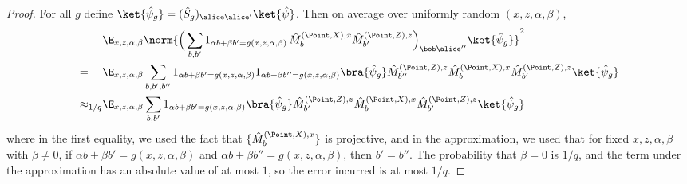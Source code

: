 \begin{proof}
	For all $g$ define $ \ket{\hat{\psi}_g} =(\hat{S}_g)_{\alice \alice'} \ket{\hat{\psi}}$. 
	Then on average over uniformly random $(x,z,\alpha,\beta)$, 
	  \begin{align}
	  	&\E_{x,z,\alpha,\beta} \norm{ \Big ( \sum_{b,b'} 1_{\alpha b + \beta b' = g(x,z,\alpha,\beta)} \, \hat{M}^{(\Point,X),x}_{b} \hat{M}^{(\Point,Z),z}_{b'} \Big)_{\bob \alice''} \ket{\hat{\psi}_g} }^2\notag \\
		=_{\phantom{1/q}}& \E_{x,z,\alpha,\beta} \sum_{b,b',b''} 1_{\alpha b + \beta b' = g(x,z,\alpha,\beta)} 1_{\alpha b + \beta b'' = g(x,z,\alpha,\beta)} \bra{\hat{\psi}_g}  \hat{M}^{(\Point,Z),z}_{b''} \hat{M}^{(\Point,X),x}_{b} \hat{M}^{(\Point,Z),z}_{b'} \ket{\hat{\psi}_g} \notag\\
		\approx_{1/q}& \E_{x,z,\alpha,\beta} \sum_{b,b'} 1_{\alpha b + \beta b' = g(x,z,\alpha,\beta)} \bra{\hat{\psi}_g}  \hat{M}^{(\Point,Z),z}_{b'} \hat{M}^{(\Point,X),x}_{b} \hat{M}^{(\Point,Z),z}_{b'} \ket{\hat{\psi}_g}
		\label{eq:qld-g-prime}
	  \end{align}
	  where in the first equality, we used the fact that $ \{  \hat{M}^{(\Point,X),x}_{b} \}$ is projective, and in the approximation, we used that for fixed $x,z,\alpha,\beta$ with $\beta \neq 0$, if $\alpha b + \beta b' = g(x,z,\alpha,\beta)$ and $\alpha b + \beta b'' = g(x,z,\alpha,\beta)$, then $b' = b''$. The probability that $\beta = 0$ is $1/q$, and the term under the approximation has an absolute value of at most $1$, so the error incurred is at most $1/q$.


\end{proof}
